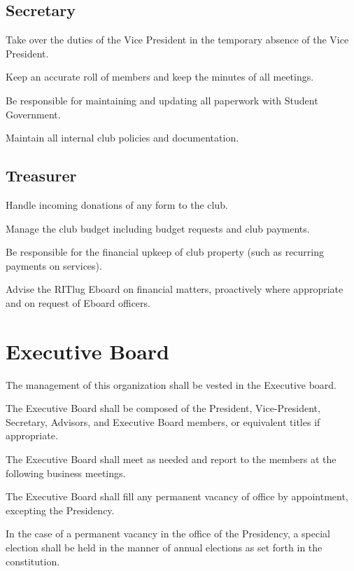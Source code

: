 \subsection{Secretary}
\begin{subroutines}
	\item Take over the duties of the Vice President in the temporary absence of the Vice President.
	\item Keep an accurate roll of members and keep the minutes of all meetings.
	\item Be responsible for maintaining and updating all paperwork with Student Government.
	\item Maintain all internal club policies and documentation.
\end{subroutines}
\subsection{Treasurer}
\begin{subroutines}
        \item Handle incoming donations of any form to the club.
        \item Manage the club budget including budget requests and club payments.
        \item Be responsible for the financial upkeep of club property (such as recurring payments on services).
        \item Advise the RITlug Eboard on financial matters, proactively where appropriate and on request of Eboard officers.
\end{subroutines}

\section{Executive Board}
\begin{subroutines}
\item The management of this organization shall be vested in the Executive board.
\item The Executive Board shall be composed of the President, Vice-President, Secretary, Advisors, and Executive Board members, or equivalent titles if appropriate.
\item The Executive Board shall meet as needed and report to the members at the following business meetings.
\item The Executive Board shall fill any permanent vacancy of office by appointment, excepting the Presidency.
\item In the case of a permanent vacancy in the office of the Presidency, a special election shall be held in the manner of annual elections as set forth in the constitution.
\end{subroutines}

